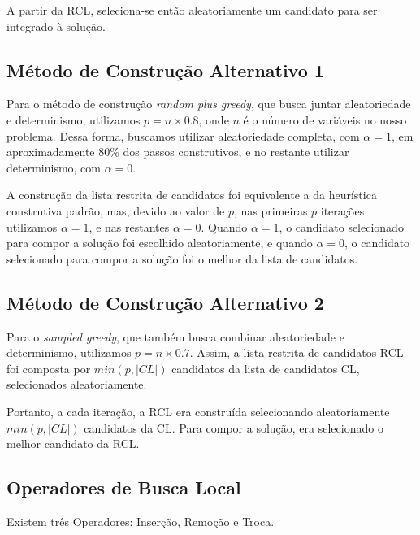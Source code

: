 \documentclass{article}
\theoremstyle{definition}
\begin{document}
A partir da RCL, seleciona-se então aleatoriamente um candidato para ser integrado à solução.

\subsection{Método de Construção Alternativo 1}
Para o método de construção \textit{random plus greedy}, que busca juntar aleatoriedade e determinismo, utilizamos $p = n \times 0.8$, onde $n$ é o número de variáveis no nosso problema. Dessa forma, buscamos utilizar aleatoriedade completa, com $\alpha = 1$, em aproximadamente $80\%$ dos passos construtivos, e no restante utilizar determinismo, com $\alpha = 0$.

A construção da lista restrita de candidatos foi equivalente a da heurística construtiva padrão, mas, devido ao valor de $p$, nas primeiras $p$ iterações utilizamos $\alpha = 1$, e nas restantes $\alpha = 0$. Quando $\alpha = 1$, o candidato selecionado para compor a solução foi escolhido aleatoriamente, e quando $\alpha = 0$, o candidato selecionado para compor a solução foi o melhor da lista de candidatos.

\subsection{Método de Construção Alternativo 2}
Para o \textit{sampled greedy}, que também busca combinar aleatoriedade e determinismo, utilizamos $p = n \times 0.7$. Assim, a lista restrita de candidatos RCL foi composta por $min(p, |CL|)$ candidatos da lista de candidatos CL, selecionados aleatoriamente.

Portanto, a cada iteração, a RCL era construída selecionando aleatoriamente $min(p, |CL|)$ candidatos da CL. Para compor a solução, era selecionado o melhor candidato da RCL.

\subsection{Operadores de Busca Local}
Existem três Operadores: Inserção, Remoção e Troca.
\end{document}
